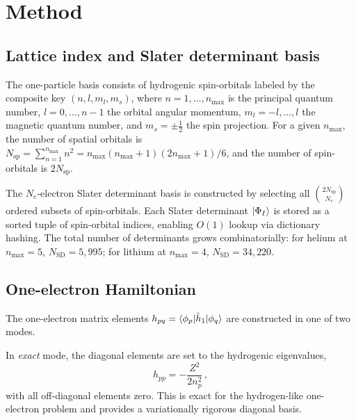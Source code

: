 \documentclass[aps,pra,twocolumn,superscriptaddress,longbibliography,floatfix]{revtex4-2}
\begin{document}
\section{Method}
\label{sec:method}

\subsection{Lattice index and Slater determinant basis}
\label{sec:lattice_index}

The one-particle basis consists of hydrogenic spin-orbitals labeled
by the composite key $(n, l, m_l, m_s)$, where $n = 1, \ldots, n_{\max}$
is the principal quantum number, $l = 0, \ldots, n-1$ the orbital
angular momentum, $m_l = -l, \ldots, l$ the magnetic quantum number,
and $m_s = \pm\tfrac{1}{2}$ the spin projection.
For a given $n_{\max}$, the number of spatial orbitals is
$N_{\text{sp}} = \sum_{n=1}^{n_{\max}} n^2 = n_{\max}(n_{\max}+1)(2n_{\max}+1)/6$,
and the number of spin-orbitals is $2N_{\text{sp}}$.

The $N_e$-electron Slater determinant basis is constructed by
selecting all $\binom{2N_{\text{sp}}}{N_e}$ ordered subsets of
spin-orbitals.
Each Slater determinant $\ket{\Phi_I}$ is stored as a sorted tuple
of spin-orbital indices, enabling $O(1)$ lookup via dictionary hashing.
The total number of determinants grows combinatorially:
for helium at $n_{\max}=5$, $N_{\text{SD}} = 5{,}995$;
for lithium at $n_{\max}=4$, $N_{\text{SD}} = 34{,}220$.

\subsection{One-electron Hamiltonian}
\label{sec:one_electron}

The one-electron matrix elements
$h_{pq} = \braket{\phi_p | \hat{h}_1 | \phi_q}$
are constructed in one of two modes.

In \emph{exact} mode, the diagonal elements are set to the
hydrogenic eigenvalues,
\begin{equation}
h_{pp} = -\frac{Z^2}{2n_p^2}\,,
\label{eq:h1_exact}
\end{equation}
with all off-diagonal elements zero.
This is exact for the hydrogen-like one-electron problem and provides
a variationally rigorous diagonal basis.
\end{document}
